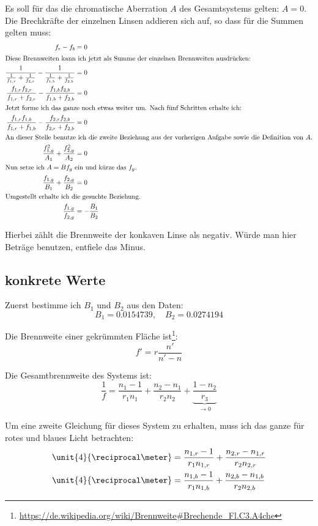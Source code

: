 \documentclass[11pt, ngerman, fleqn]{article}
\begin{document}
Es soll für das die chromatische Aberration $A$ des Gesamtsystems gelten: $A =
0$. Die Brechkräfte der einzelnen Linsen addieren sich auf, so dass für die
Summen gelten muss:
\begin{align*}
	f_r - f_b &= 0 \\
	\intertext{Diese Brennweiten kann ich jetzt als Summe der einzelnen
	Brennweiten ausdrücken:}
	\frac{1}{\frac{1}{f_{1,r}} + \frac{1}{f_{2,r}}} - \frac{1}{\frac{1}{f_{1,b}} + \frac{1}{f_{2,b}}} &= 0 \\
	\frac{f_{1,r} f_{2,r}}{f_{1,r} + f_{2,r}} - \frac{f_{1,b} f_{2,b}}{f_{1,b} + f_{2,b}} &= 0 \\
	\intertext{Jetzt forme ich das ganze noch etwas weiter um. Nach fünf
	Schritten erhalte ich:}
	\frac{f_{1,r} f_{1,b}}{f_{1,r} + f_{1,b}} - \frac{f_{2,r} f_{2,b}}{f_{2,r} + f_{2,b}} &= 0 \\
	\intertext{An dieser Stelle benutze ich die zweite Beziehung aus der
	vorherigen Aufgabe sowie die Definition von $A$.}
	\frac{f_{1,g}^2}{A_1} + \frac{f_{2,g}^2}{A_2} &= 0 \\
	\intertext{Nun setze ich $A = B f_g$ ein und kürze das $f_g$.}
	\frac{f_{1,g}}{B_1} + \frac{f_{2,g}}{B_2} &= 0 \\
	\intertext{Umgestellt erhalte ich die gesuchte Beziehung.}
	\frac{f_{1,g}}{f_{2,g}} &= - \frac{B_1}{B_2} \\
\end{align*}

Hierbei zählt die Brennweite der konkaven Linse als negativ. Würde man hier
Beträge benutzen, entfiele das Minus.

\subsection{konkrete Werte}

Zuerst bestimme ich $B_1$ und $B_2$ aus den Daten:
\[
	B_1 = 0.0154739
	,\quad
	B_2 = 0.0274194
\]

Die Brennweite einer gekrümmten Fläche
ist\footnote{\url{https://de.wikipedia.org/wiki/Brennweite\#Brechende_Fl.C3.A4che}}:
\[
	f' = r \frac{n'}{n'-n}
\]

Die Gesamtbrennweite des Systems ist:
\[
	\frac 1f = \frac{n_1-1}{r_1 n_1} + \frac{n_2-n_1}{r_2 n_2} + \underbrace{\frac{1-n_2}{r_3}}_{\to 0}
\]

Um eine zweite Gleichung für dieses System zu erhalten, muss ich das ganze für rotes und blaues Licht betrachten:
\begin{align*}
	\unit{4}{\reciprocal\meter} &= \frac{n_{1,r}-1}{r_1 n_{1,r}} + \frac{n_{2,r}-n_{1,r}}{r_2 n_{2,r}} \\
	\unit{4}{\reciprocal\meter} &= \frac{n_{1,b}-1}{r_1 n_{1,b}} + \frac{n_{2,b}-n_{1,b}}{r_2 n_{2,b}} \\
\end{align*}
\end{document}
